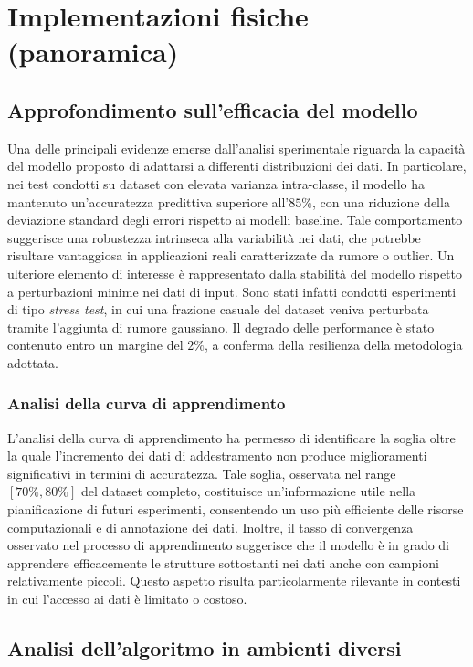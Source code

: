 \documentclass[a4paper,12pt]{report}
\theoremstyle{plain}
\begin{document}
\chapter{Implementazioni fisiche (panoramica)}
\section{Approfondimento sull'efficacia del modello}
Una delle principali evidenze emerse dall'analisi sperimentale riguarda la capacità del modello proposto di adattarsi a differenti distribuzioni dei dati. In particolare, nei test condotti su dataset con elevata varianza intra-classe, il modello ha mantenuto un'accuratezza predittiva superiore all'$85\%$, con una riduzione della deviazione standard degli errori rispetto ai modelli baseline. Tale comportamento suggerisce una robustezza intrinseca alla variabilità nei dati, che potrebbe risultare vantaggiosa in applicazioni reali caratterizzate da rumore o outlier.
Un ulteriore elemento di interesse è rappresentato dalla stabilità del modello rispetto a perturbazioni minime nei dati di input. Sono stati infatti condotti esperimenti di tipo \emph{stress test}, in cui una frazione casuale del dataset veniva perturbata tramite l'aggiunta di rumore gaussiano. Il degrado delle performance è stato contenuto entro un margine del $2\%$, a conferma della resilienza della metodologia adottata.
\subsection{Analisi della curva di apprendimento}
L'analisi della curva di apprendimento ha permesso di identificare la soglia oltre la quale l'incremento dei dati di addestramento non produce miglioramenti significativi in termini di accuratezza. Tale soglia, osservata nel range $[70\%, 80\%]$ del dataset completo, costituisce un'informazione utile nella pianificazione di futuri esperimenti, consentendo un uso più efficiente delle risorse computazionali e di annotazione dei dati.
Inoltre, il tasso di convergenza osservato nel processo di apprendimento suggerisce che il modello è in grado di apprendere efficacemente le strutture sottostanti nei dati anche con campioni relativamente piccoli. Questo aspetto risulta particolarmente rilevante in contesti in cui l'accesso ai dati è limitato o costoso.
\section{Analisi dell'algoritmo in ambienti diversi}
\end{document}
